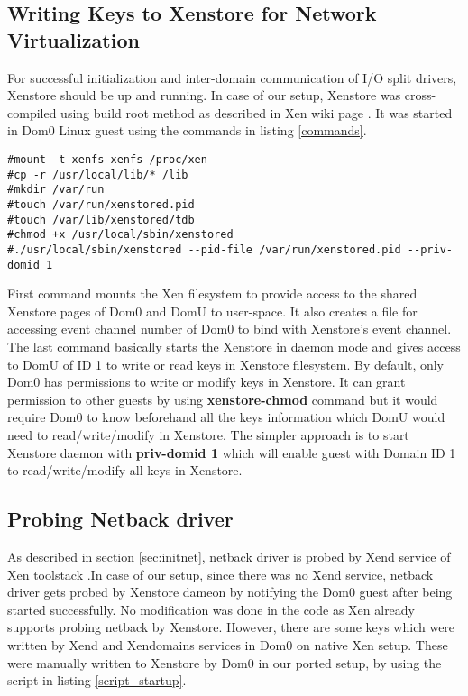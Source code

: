 \subsection{Writing Keys to Xenstore for Network Virtualization \label{sec:keys}}
For successful initialization and inter-domain communication of I/O split drivers, Xenstore should be up and running. In case of our setup, Xenstore was cross-compiled using build root method as described in Xen wiki page \cite{cross_compile}. It was started in Dom0 Linux guest using the commands in listing \ref{commands}.

\begin{lstlisting}[caption= Commands for startin Xenstore dameon in Dom0 on PHIDIAS , label={commands},]
#mount -t xenfs xenfs /proc/xen
#cp -r /usr/local/lib/* /lib
#mkdir /var/run
#touch /var/run/xenstored.pid
#touch /var/lib/xenstored/tdb
#chmod +x /usr/local/sbin/xenstored
#./usr/local/sbin/xenstored --pid-file /var/run/xenstored.pid --priv-domid 1

\end{lstlisting}

First command mounts the Xen filesystem to provide access to the shared Xenstore pages of Dom0 and DomU to user-space. It also creates a file for accessing event channel number of Dom0 to bind with Xenstore's event channel. The last command basically starts the Xenstore in daemon mode and gives access to DomU of ID 1 to write or read keys in Xenstore filesystem. By default, only Dom0 has permissions to write or modify keys in Xenstore. It can grant permission to other guests by using \textbf{xenstore-chmod} command but it would require Dom0 to know beforehand all the keys information which DomU would need to read/write/modify in Xenstore. The simpler approach is to start Xenstore daemon with \textbf{priv-domid 1} which will enable guest with Domain ID 1 to read/write/modify all keys in Xenstore.

\subsection{Probing Netback driver \label{sec:probenetback}}
As described in section \ref{sec:initnet}, netback driver is probed by Xend service of Xen toolstack .In case of our setup, since there was no Xend service, netback driver gets probed by Xenstore dameon by notifying the Dom0 guest after being started successfully. No modification was done in the code as Xen already supports probing netback by Xenstore. However, there are some keys which were written by Xend and Xendomains services in Dom0 on native Xen setup. These were manually written to Xenstore by Dom0 in our ported setup, by using the script in listing \ref{script_startup}.

